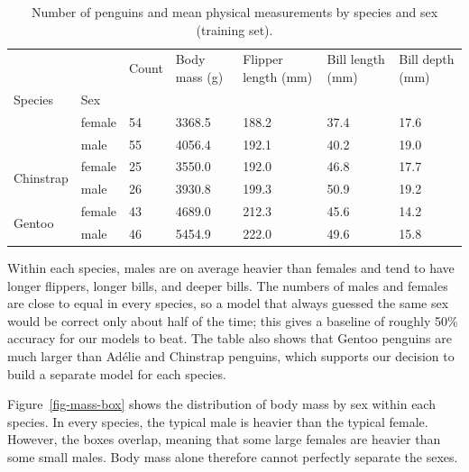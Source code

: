\documentclass[
  letterpaper,
  DIV=11,
  numbers=noendperiod]{scrartcl}
\begin{document}
{

\begin{longtable}[]{@{}lllllll@{}}

\caption{\label{tbl-summary}Number of penguins and mean physical
measurements by species and sex (training set).}

\tabularnewline

\toprule\noalign{}
& & Count & Body mass (g) & Flipper length (mm) & Bill length (mm) &
Bill depth (mm) \\
Species & Sex & & & & & \\
\midrule\noalign{}
\endhead
\bottomrule\noalign{}
\endlastfoot
\multirow{2}{*}{Adelie} & female & 54 & 3368.5 & 188.2 & 37.4 & 17.6 \\
& male & 55 & 4056.4 & 192.1 & 40.2 & 19.0 \\
\multirow{2}{*}{Chinstrap} & female & 25 & 3550.0 & 192.0 & 46.8 &
17.7 \\
& male & 26 & 3930.8 & 199.3 & 50.9 & 19.2 \\
\multirow{2}{*}{Gentoo} & female & 43 & 4689.0 & 212.3 & 45.6 & 14.2 \\
& male & 46 & 5454.9 & 222.0 & 49.6 & 15.8 \\

\end{longtable}

}

Within each species, males are on average heavier than females and tend
to have longer flippers, longer bills, and deeper bills. The numbers of
males and females are close to equal in every species, so a model that
always guessed the same sex would be correct only about half of the
time; this gives a baseline of roughly 50\% accuracy for our models to
beat. The table also shows that Gentoo penguins are much larger than
Adélie and Chinstrap penguins, which supports our decision to build a
separate model for each species.

Figure~\ref{fig-mass-box} shows the distribution of body mass by sex
within each species. In every species, the typical male is heavier than
the typical female. However, the boxes overlap, meaning that some large
females are heavier than some small males. Body mass alone therefore
cannot perfectly separate the sexes.
\end{document}
